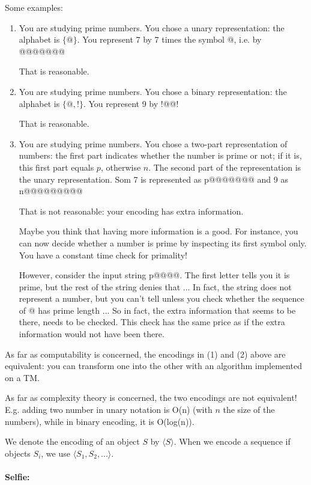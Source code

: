 Some examples:
\begin{enumerate}
\item 
You are studying prime numbers. You chose a unary representation: the
alphabet is $\{@\}$. You represent 7 by 7 times the symbol @, i.e. by
@@@@@@@

That is reasonable.

\item 
You are studying prime numbers. You chose a binary representation: the
alphabet is $\{@,!\}$. You represent 9 by !@@!

That is reasonable.


\item 
You are studying prime numbers. You chose a two-part representation of
numbers: the first part indicates whether the number is prime or not;
if it is, this first part equals $p$, otherwise $n$. The second part
of the representation is the unary representation. Som 7 is
represented as p@@@@@@@ and 9 as n@@@@@@@@@

That is not reasonable: your encoding has extra information.

Maybe you think that having more information is a good. For instance,
you can now decide whether a number is prime by inspecting its first
symbol only. You have a constant time check for primality!

However, consider the input string p@@@@. The first letter tells you
it is prime, but the rest of the string denies that ... In fact, the
string does not represent a number, but you can't tell unless you
check whether the sequence of @ has prime length ... So in fact, the
extra information that seems to be there, needs to be checked. This
check has the same price as if the extra information would not have
been there.

\end{enumerate}


As far as computability is concerned, the encodings in (1) and (2)
above are equivalent: you can transform one into the other with an
algorithm implemented on a TM.

As far as complexity theory is concerned, the two encodings are not
equivalent! E.g. adding two number in unary notation is O(n) (with $n$
the size of the numbers), while in binary encoding, it is
O(log(n)).

We denote the encoding of an object $S$ by $\langle S \rangle$. When
we encode a sequence if objects $S_i$, we use $\langle
S_1,S_2,... \rangle$.

\paragraph{Selfie:}

